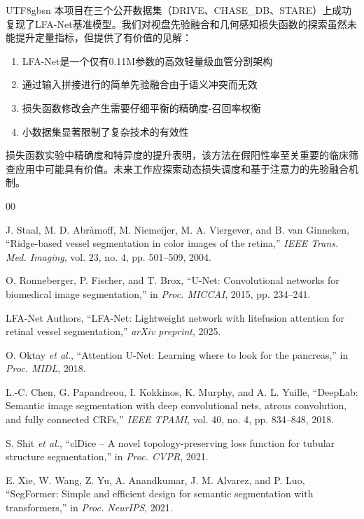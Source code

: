 \documentclass[conference]{IEEEtran}
\begin{document}
\begin{CJK}{UTF8}{gbsn}
本项目在三个公开数据集（DRIVE、CHASE\_DB、STARE）上成功复现了LFA-Net基准模型。我们对视盘先验融合和几何感知损失函数的探索虽然未能提升定量指标，但提供了有价值的见解：

\begin{enumerate}
    \item LFA-Net是一个仅有0.11M参数的高效轻量级血管分割架构
    \item 通过输入拼接进行的简单先验融合由于语义冲突而无效
    \item 损失函数修改会产生需要仔细平衡的精确度-召回率权衡
    \item 小数据集显著限制了复杂技术的有效性
\end{enumerate}

损失函数实验中精确度和特异度的提升表明，该方法在假阳性率至关重要的临床筛查应用中可能具有价值。未来工作应探索动态损失调度和基于注意力的先验融合机制。


\begin{thebibliography}{00}

J. Staal, M. D. Abràmoff, M. Niemeijer, M. A. Viergever, and B. van Ginneken, ``Ridge-based vessel segmentation in color images of the retina,'' \emph{IEEE Trans. Med. Imaging}, vol. 23, no. 4, pp. 501--509, 2004.

O. Ronneberger, P. Fischer, and T. Brox, ``U-Net: Convolutional networks for biomedical image segmentation,'' in \emph{Proc. MICCAI}, 2015, pp. 234--241.

LFA-Net Authors, ``LFA-Net: Lightweight network with litefusion attention for retinal vessel segmentation,'' \emph{arXiv preprint}, 2025.

O. Oktay \emph{et al.}, ``Attention U-Net: Learning where to look for the pancreas,'' in \emph{Proc. MIDL}, 2018.

L.-C. Chen, G. Papandreou, I. Kokkinos, K. Murphy, and A. L. Yuille, ``DeepLab: Semantic image segmentation with deep convolutional nets, atrous convolution, and fully connected CRFs,'' \emph{IEEE TPAMI}, vol. 40, no. 4, pp. 834--848, 2018.

S. Shit \emph{et al.}, ``clDice -- A novel topology-preserving loss function for tubular structure segmentation,'' in \emph{Proc. CVPR}, 2021.

E. Xie, W. Wang, Z. Yu, A. Anandkumar, J. M. Alvarez, and P. Luo, ``SegFormer: Simple and efficient design for semantic segmentation with transformers,'' in \emph{Proc. NeurIPS}, 2021.


\end{thebibliography}
\end{CJK}
\end{document}
